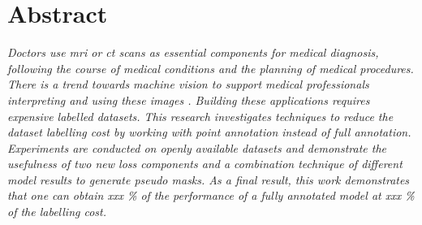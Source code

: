 \chapter*{Abstract}

\begin{multicols}{2}
\thispagestyle{plain}
\par{
    \textit{
        Doctors use \acrfull{mri} or \acrfull{ct} scans as essential components for medical diagnosis, following the course of medical conditions and the planning of medical procedures.
        There is a trend towards machine vision to support medical professionals interpreting and using these images .
        Building these applications requires expensive labelled datasets.
        This research investigates techniques to reduce the dataset labelling cost by working with point annotation instead of full annotation.
        Experiments are conducted on openly available datasets and demonstrate the usefulness of two new loss components and a combination technique of different model results to generate pseudo masks.
        As a final result, this work demonstrates that one can obtain xxx \% of the performance of a fully annotated model at xxx \% of the labelling cost. 
    }
}

\end{multicols}
